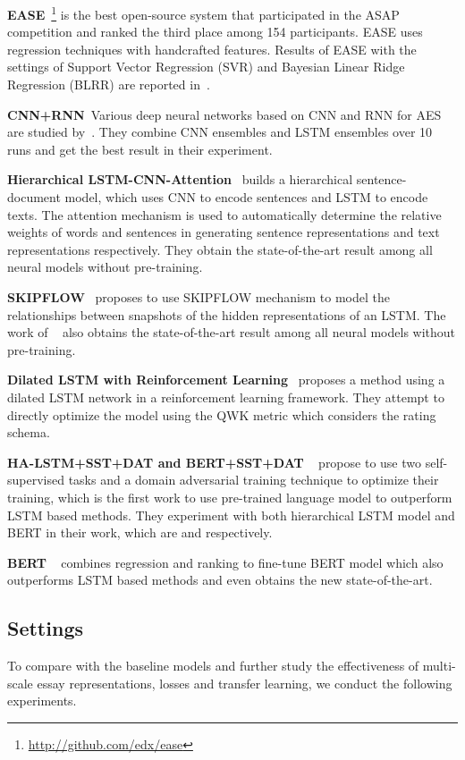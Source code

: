 \documentclass[11pt]{article}
\begin{document}
\textbf{EASE}~\footnote{\url{http://github.com/edx/ease}} is the best open-source system that participated in the ASAP competition and ranked the third place among 154 participants.
EASE uses regression techniques with handcrafted features.
Results of EASE with the settings of Support Vector Regression (SVR) and Bayesian Linear Ridge Regression (BLRR) are reported in~\citep{Phandi:2015}.

\textbf{CNN+RNN}~Various deep neural networks based on CNN and RNN for AES are studied by~\citep{Taghipour:2016}.
They combine CNN ensembles and LSTM ensembles over 10 runs and get the best result in their experiment.

\textbf{Hierarchical LSTM-CNN-Attention}~\citep{Dong:2017} builds a hierarchical sentence-document model, which uses CNN to encode sentences and LSTM to encode texts.
The attention mechanism is used to automatically determine the relative weights of words and sentences in generating sentence representations and text representations respectively. They obtain the state-of-the-art result among all neural models without pre-training. 

\textbf{SKIPFLOW}~\citep{Tay:2018} proposes to use SKIPFLOW mechanism to model the relationships between snapshots of the hidden representations of an LSTM.
The work of ~\citep{Tay:2018} also obtains the state-of-the-art result among all neural models without pre-training. 

\textbf{Dilated LSTM with Reinforcement Learning}~\citep{Wang:2018} proposes a method using a dilated LSTM network in a reinforcement learning framework.
They attempt to directly optimize the model using the QWK metric which considers the rating schema.

\textbf{HA-LSTM+SST+DAT and BERT+SST+DAT} ~\citep{Cao:2020} propose to use two self-supervised tasks and a domain adversarial training technique to optimize their training, which is the first work to use pre-trained language model to outperform LSTM based methods. They experiment with both hierarchical LSTM model and BERT in their work, which are  and  respectively.

\textbf{BERT} ~\citep{Yang:2020} combines regression and ranking to fine-tune BERT model which also outperforms LSTM based methods and even obtains the new state-of-the-art.




\subsection{Settings}
To compare with the baseline models and further study the effectiveness of multi-scale essay representations, losses and transfer learning, we conduct the following experiments. 
\end{document}
